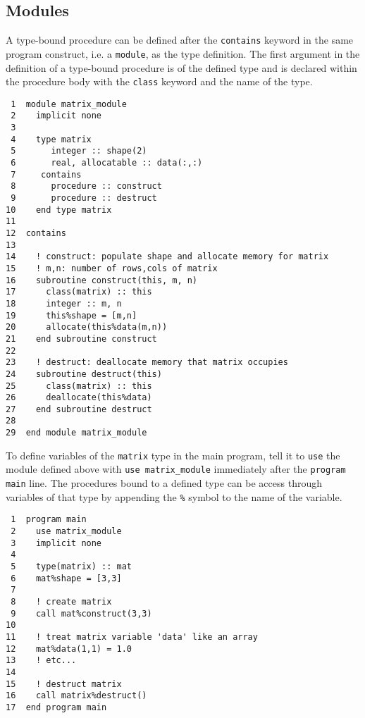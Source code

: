 \documentclass[11pt]{article}
\begin{document}
\subsection{Modules}
\label{sec:orgheadline53}
A type-bound procedure can be defined after the \texttt{contains} keyword in the same program construct, i.e. a \texttt{module}, as the type definition. The first argument in the definition of a type-bound procedure is of the defined type and is declared within the procedure body with the \texttt{class} keyword and the name of the type.

\begin{verbatim}
 1  module matrix_module
 2    implicit none
 3  
 4    type matrix
 5       integer :: shape(2)
 6       real, allocatable :: data(:,:)
 7     contains
 8       procedure :: construct
 9       procedure :: destruct
10    end type matrix
11  
12  contains
13  
14    ! construct: populate shape and allocate memory for matrix
15    ! m,n: number of rows,cols of matrix
16    subroutine construct(this, m, n)
17      class(matrix) :: this
18      integer :: m, n
19      this%shape = [m,n]
20      allocate(this%data(m,n))
21    end subroutine construct
22  
23    ! destruct: deallocate memory that matrix occupies
24    subroutine destruct(this)
25      class(matrix) :: this
26      deallocate(this%data)
27    end subroutine destruct
28  
29  end module matrix_module
\end{verbatim}

To define variables of the \texttt{matrix} type in the main program, tell it to \texttt{use} the module defined above with \texttt{use matrix\_module} immediately after the \texttt{program main} line. The procedures bound to a defined type can be access through variables of that type by appending the \texttt{\%} symbol to the name of the variable. 

\begin{verbatim}
 1  program main
 2    use matrix_module
 3    implicit none
 4  
 5    type(matrix) :: mat
 6    mat%shape = [3,3]
 7  
 8    ! create matrix
 9    call mat%construct(3,3)
10  
11    ! treat matrix variable 'data' like an array
12    mat%data(1,1) = 1.0
13    ! etc...
14  
15    ! destruct matrix
16    call matrix%destruct()
17  end program main
\end{verbatim}
\end{document}
